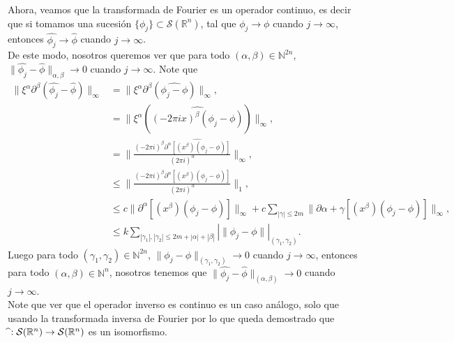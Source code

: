 \begin{homeworkProblem}
\begin{solution}
		Ahora, veamos que la transformada de Fourier es un operador continuo, es decir que si tomamos una sucesión $\{\phi_j\}\subset \mathcal{S}(\mathbb{R}^n)$, tal que $\phi_j \rightarrow \phi$ cuando $j\rightarrow \infty$, entonces $\hat{\phi_j}\rightarrow \hat{\phi}$ cuando $j\rightarrow \infty$.\\
		  De este modo, nosotros queremos ver que para todo $(\alpha,\beta)\in\mathbb{N}^{2n}$, $\|\hat{\phi_j}-\hat{\phi}\|_{\alpha,\beta}\rightarrow 0$ cuando $j\rightarrow \infty$. Note que
      \begin{align*}
			  \|\xi^{\alpha}\partial^{\beta}(\hat{\phi_j}-\hat{\phi})\|_{\infty}&=\|\xi^{\alpha}\partial^{\beta}(\hat{\phi_j-\phi})\|_{\infty},\\
			  &=\|\xi^{\alpha}(\hat{(-2\pi ix)^{\beta}(\phi_j-\phi)})\|_{\infty},\\
			  &=\|\frac{(-2\pi i)^{\beta}\hat{\partial^{\alpha}[(x^\beta)(\phi_j-\phi)]}}{(2\pi i)^{\alpha}}\|_{\infty},\\
			  &\leq\|\frac{(-2\pi i)^{\beta}\partial^{\alpha}[(x^\beta)(\phi_j-\phi)]}{(2\pi i)^{\alpha}}\|_{1},\\
			  &\leq c\|\partial^{\alpha}[(x^\beta)(\phi_j-\phi)]\|_{\infty}+c\sum_{|\gamma|\leq 2m}\|\partial{\alpha+\gamma}[(x^\beta)(\phi_j-\phi)]\|_{\infty},\\
			  &\leq k \sum_{|\gamma_1|,|\gamma_2|\leq2m+|\alpha|+|\beta|}|\|\phi_j-\phi\||_{(\gamma_1,\gamma_2)}.
		  \end{align*}
		  Luego para todo $(\gamma_1,\gamma_2)\in\mathbb{N}^{2n}$, $\|\phi_j-\phi\|_{(\gamma_1,\gamma_2)}\rightarrow 0$ cuando $j\rightarrow \infty$, entonces para todo $(\alpha,\beta)\in\mathbb{N}^{n}$, nosotros tenemos que $\|\hat{\phi_j}-\hat{\phi}\|_{(\alpha,\beta)}\rightarrow 0$ cuando $j\rightarrow \infty$.\\
      Note que ver que el operador inverso es continuo es un caso análogo, solo que usando la transformada inversa de Fourier por lo que queda demostrado que \phantom{  }$\hat{\empty}:\mathcal{S}(\mathbb{R}^n)\rightarrow\mathcal{S}(\mathbb{R}^n)$ es un isomorfismo.
  \end{solution}
\end{homeworkProblem}
